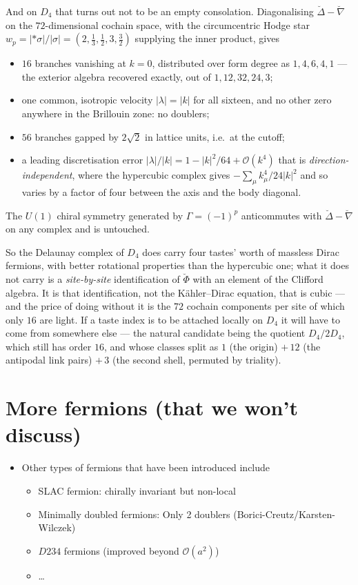 {And on $D_4$ that turns out not to be an empty consolation. Diagonalising
$\breve\Delta-\breve\nabla$ on the $72$-dimensional cochain space, with the
circumcentric Hodge star $w_p = |{\ast\sigma}|/|\sigma| =
(2,\tfrac13,\tfrac12,3,\tfrac32)$ supplying the inner product, gives
\begin{itemize}
  \item $16$ branches vanishing at $k=0$, distributed over form degree as
    $1,4,6,4,1$ --- the exterior algebra recovered exactly, out of $1,12,32,24,3$;
  \item one common, isotropic velocity $|\lambda|=|k|$ for all sixteen, and no
    other zero anywhere in the Brillouin zone: no doublers;
  \item $56$ branches gapped by $2\sqrt2$ in lattice units, i.e.\ at the cutoff;
  \item a leading discretisation error
    $|\lambda|/|k| = 1 - |k|^2/64 + \mathcal{O}(k^4)$ that is
    \emph{direction-inde\-pendent}, where the hypercubic complex gives
    $-\sum_\mu k_\mu^4/24|k|^2$ and so varies by a factor of four between the
    axis and the body diagonal.
\end{itemize}
The $U(1)$ chiral symmetry generated by $\Gamma=(-1)^p$ anticommutes with
$\breve\Delta-\breve\nabla$ on any complex and is untouched.

So the Delaunay complex of $D_4$ does carry four tastes' worth of massless Dirac
fermions, with better rotational properties than the hypercubic one; what it does
not carry is a \emph{site-by-site} identification of $\breve\Phi$ with an element
of the Clifford algebra. It is that identification, not the K\"ahler--Dirac
equation, that is cubic --- and the price of doing without it is the $72$ cochain
components per site of which only $16$ are light. If a taste index is to be
attached locally on $D_4$ it will have to come from somewhere else --- the
natural candidate being the quotient $D_4/2D_4$, which still has order $16$, and
whose classes split as $1$ (the origin) $+\,12$ (the antipodal link pairs)
$+\,3$ (the second shell, permuted by triality).
}

\section{More fermions (that we won't discuss)}
  \begin{itemize}
  \item Other types of fermions that have been introduced include
    \begin{itemize}
      \item SLAC fermion: chirally invariant but non-local
      \item Minimally doubled fermions: Only 2 doublers (Borici-Creutz/Karsten-Wilczek)
      \item $D234$ fermions (improved beyond $\mathcal{O}(a^2)$)
      \item \ldots
    \end{itemize}
\end{itemize}

